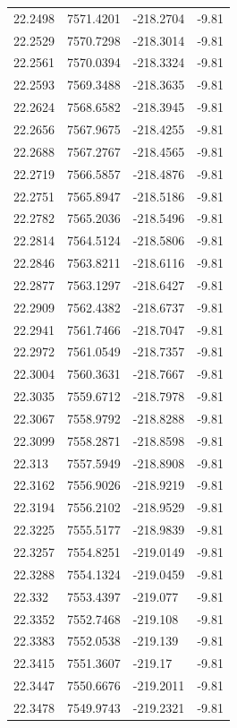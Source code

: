\begin{table}[H]
\begin{tabular}{llll}
22.2498 & 7571.4201 & -218.2704 & -9.81 \\
22.2529 & 7570.7298 & -218.3014 & -9.81 \\
22.2561 & 7570.0394 & -218.3324 & -9.81 \\
22.2593 & 7569.3488 & -218.3635 & -9.81 \\
22.2624 & 7568.6582 & -218.3945 & -9.81 \\
22.2656 & 7567.9675 & -218.4255 & -9.81 \\
22.2688 & 7567.2767 & -218.4565 & -9.81 \\
22.2719 & 7566.5857 & -218.4876 & -9.81 \\
22.2751 & 7565.8947 & -218.5186 & -9.81 \\
22.2782 & 7565.2036 & -218.5496 & -9.81 \\
22.2814 & 7564.5124 & -218.5806 & -9.81 \\
22.2846 & 7563.8211 & -218.6116 & -9.81 \\
22.2877 & 7563.1297 & -218.6427 & -9.81 \\
22.2909 & 7562.4382 & -218.6737 & -9.81 \\
22.2941 & 7561.7466 & -218.7047 & -9.81 \\
22.2972 & 7561.0549 & -218.7357 & -9.81 \\
22.3004 & 7560.3631 & -218.7667 & -9.81 \\
22.3035 & 7559.6712 & -218.7978 & -9.81 \\
22.3067 & 7558.9792 & -218.8288 & -9.81 \\
22.3099 & 7558.2871 & -218.8598 & -9.81 \\
22.313 & 7557.5949 & -218.8908 & -9.81 \\
22.3162 & 7556.9026 & -218.9219 & -9.81 \\
22.3194 & 7556.2102 & -218.9529 & -9.81 \\
22.3225 & 7555.5177 & -218.9839 & -9.81 \\
22.3257 & 7554.8251 & -219.0149 & -9.81 \\
22.3288 & 7554.1324 & -219.0459 & -9.81 \\
22.332 & 7553.4397 & -219.077 & -9.81 \\
22.3352 & 7552.7468 & -219.108 & -9.81 \\
22.3383 & 7552.0538 & -219.139 & -9.81 \\
22.3415 & 7551.3607 & -219.17 & -9.81 \\
22.3447 & 7550.6676 & -219.2011 & -9.81 \\
22.3478 & 7549.9743 & -219.2321 & -9.81 \\

\end{tabular}
\end{table}
